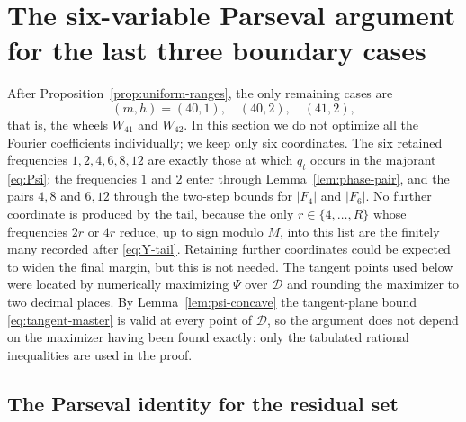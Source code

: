 \documentclass[11pt]{article}
\theoremstyle{definition}
\theoremstyle{remark}
\numberwithin{equation}{section}
\begin{document}
\section{The six-variable Parseval argument for the last three boundary cases}\label{sec:boundary}

After Proposition~\ref{prop:uniform-ranges}, the only remaining cases are
\[
  (m,h)=(40,1),\quad(40,2),\quad(41,2),
\]
that is, the wheels $W_{41}$ and $W_{42}$. In this section we do not optimize all the Fourier coefficients individually; we keep only six coordinates. The six retained frequencies $1,2,4,6,8,12$ are exactly those at which $q_t$ occurs in the majorant \eqref{eq:Psi}: the frequencies $1$ and $2$ enter through Lemma~\ref{lem:phase-pair}, and the pairs $4,8$ and $6,12$ through the two-step bounds for $|F_4|$ and $|F_6|$. No further coordinate is produced by the tail, because the only $r\in\{4,\ldots,R\}$ whose frequencies $2r$ or $4r$ reduce, up to sign modulo $M$, into this list are the finitely many recorded after \eqref{eq:Y-tail}. Retaining further coordinates could be expected to widen the final margin, but this is not needed. The tangent points used below were located by numerically maximizing $\Psi$ over $\mathcal D$ and rounding the maximizer to two decimal places. By Lemma~\ref{lem:psi-concave} the tangent-plane bound \eqref{eq:tangent-master} is valid at every point of $\mathcal D$, so the argument does not depend on the maximizer having been found exactly: only the tabulated rational inequalities are used in the proof.

\subsection{The Parseval identity for the residual set}
\end{document}
